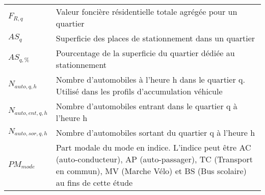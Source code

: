 \begin{longtable}{lp{5in}}
$F_{R,q}$ & Valeur foncière résidentielle totale agrégée pour un quartier\\
$AS_q$ & Superficie des places de stationnement dans un quartier\\
$AS_{q,\%}$ & Pourcentage de la superficie du quartier dédiée au stationnement\\
$N_{auto,q,h}$ & Nombre d'automobiles à l'heure h dans le quartier q. Utilisé dans les profils d'accumulation véhicule\\
$N_{auto,ent,q,h}$ & Nombre d'automobiles entrant dans le quartier q à l'heure h\\
$N_{auto,sor,q,h}$ & Nombre d'automobiles sortant du quartier q à l'heure h \\
$PM_{mode}$ & Part modale du mode en indice. L'indice peut être AC (auto-conducteur), AP (auto-passager), TC (Transport en commun), MV (Marche Vélo) et BS (Bus scolaire) au fins de cette étude 
\end{longtable}

